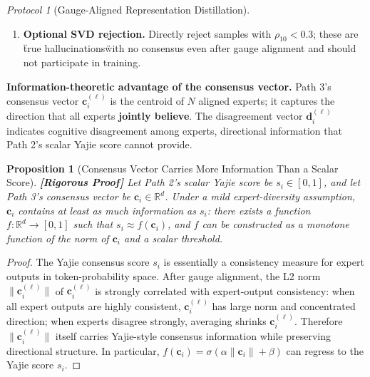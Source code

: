\documentclass[12pt,a4paper]{article}
\newtheorem{proposition}[theorem]{Proposition}
\theoremstyle{remark}
\newtheorem{protocol}[theorem]{Protocol}
\newcommand{\R}{\mathbb{R}}
\newcommand{\rigorFull}{\textnormal{\textbf{[Rigorous Proof]}}}
\begin{document}
\begin{protocol}[Gauge-Aligned Representation Distillation]
\begin{enumerate}
\begin{align}
        &+ \lambda_1 \sum_{\ell} \|\text{Proj}^{(\ell)}(S_\phi(x_i)) - \mathbf{c}_i^{(\ell)}\|^2 \quad \text{(consensus matching)} \\
        &+ \lambda_2 \sum_{\ell} \omega(\rho_{k,i}^{(\ell)}) \cdot \|\text{uncertainty}\| \quad \text{(uncertainty calibration)}
    \end{align}
    where $\omega(\rho) = \max(0, 1 - 2\rho)$ reduces the loss weight on high-hallucination samples ($\rho < 0.5$) and keeps normal weight on confident samples ($\rho > 0.5$).
    \item \textbf{Optional SVD rejection.} Directly reject samples with $\rho_{10} < 0.3$; these are \"true hallucinations\" with no consensus even after gauge alignment and should not participate in training.
\end{enumerate}
\end{protocol}

\textbf{Information-theoretic advantage of the consensus vector.} Path 3's consensus vector $\mathbf{c}_i^{(\ell)}$ is the centroid of $N$ aligned experts; it captures the direction that all experts \textbf{jointly believe}. The disagreement vector $\mathbf{d}_i^{(\ell)}$ indicates cognitive disagreement among experts, directional information that Path 2's scalar Yajie score cannot provide.

\begin{proposition}[Consensus Vector Carries More Information Than a Scalar Score]\label{prop:consensus_info}\rigorFull
Let Path 2's scalar Yajie score be $s_i \in [0,1]$, and let Path 3's consensus vector be $\mathbf{c}_i \in \R^d$. Under a mild expert-diversity assumption, $\mathbf{c}_i$ contains at least as much information as $s_i$: there exists a function $f: \R^d \to [0,1]$ such that $s_i \approx f(\mathbf{c}_i)$, and $f$ can be constructed as a monotone function of the norm of $\mathbf{c}_i$ and a scalar threshold.
\end{proposition}

\begin{proof}
The Yajie consensus score $s_i$ is essentially a consistency measure for expert outputs in token-probability space. After gauge alignment, the L2 norm $\|\mathbf{c}_i^{(\ell)}\|$ of $\mathbf{c}_i^{(\ell)}$ is strongly correlated with expert-output consistency: when all expert outputs are highly consistent, $\mathbf{c}_i^{(\ell)}$ has large norm and concentrated direction; when experts disagree strongly, averaging shrinks $\mathbf{c}_i^{(\ell)}$. Therefore $\|\mathbf{c}_i^{(\ell)}\|$ itself carries Yajie-style consensus information while preserving directional structure. In particular, $f(\mathbf{c}_i) = \sigma(\alpha \|\mathbf{c}_i\| + \beta)$ can regress to the Yajie score $s_i$.
\end{proof}
\end{document}
